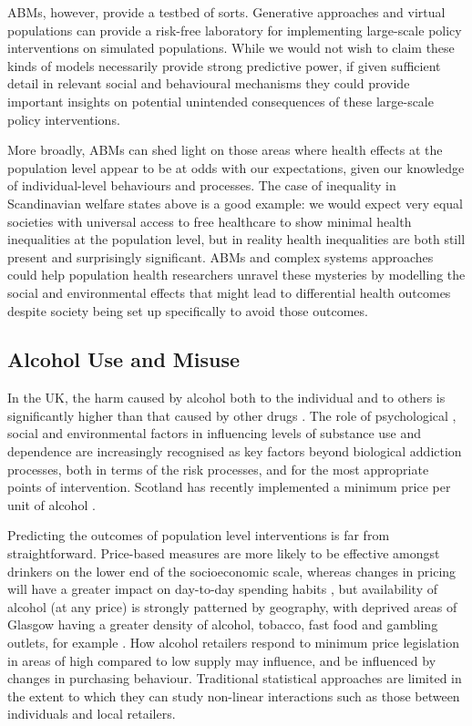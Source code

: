 \documentclass[review]{elsarticle}
\begin{document}
ABMs, however, provide a testbed of sorts.  Generative approaches and virtual populations can provide a risk-free laboratory for implementing large-scale policy interventions on simulated populations.  While we would not wish to claim these kinds of models necessarily provide strong predictive power, if given sufficient detail in relevant social and behavioural mechanisms they could provide important insights on potential unintended consequences of these large-scale policy interventions.

More broadly, ABMs can shed light on those areas where health effects at the population level appear to be at odds with our expectations, given our knowledge of individual-level behaviours and processes.  The case of inequality in Scandinavian welfare states above is a good example: we would expect very equal societies with universal access to free healthcare to show minimal health inequalities at the population level, but in reality health inequalities are both still present and surprisingly significant.  ABMs and complex systems approaches could help population health researchers unravel these mysteries by modelling the social and environmental effects that might lead to differential health outcomes despite society being set up specifically to avoid those outcomes.

\subsection{Alcohol Use and Misuse}

In the UK, the harm caused by alcohol both to the individual and to others is significantly higher than that caused by other drugs \citep{nutt2010}. The role of psychological \citep{hammersley2014}, social \citep{meier2018} and environmental factors \citep{birckmayer2004} in influencing levels of substance use and dependence are increasingly recognised as key factors beyond biological addiction processes, both in terms of the risk processes, and for the most appropriate points of intervention. Scotland has recently implemented a minimum price per unit of alcohol \citep{brennan2014}. 

Predicting the outcomes of population level interventions is far from straightforward. Price-based measures are more likely to be effective amongst drinkers on the lower end of the socioeconomic scale, whereas changes in pricing will have a greater impact on day-to-day spending habits \citep{holmes2014}, but availability of alcohol (at any price) is strongly patterned by geography, with deprived areas of Glasgow having a greater density of alcohol, tobacco, fast food and gambling outlets, for example \citep{macdonald2018}. How alcohol retailers respond to minimum price legislation in areas of high compared to low supply may influence, and be influenced by changes in purchasing behaviour. Traditional statistical approaches are limited in the extent to which they can study non-linear interactions such as those between individuals and local retailers.   
\end{document}
